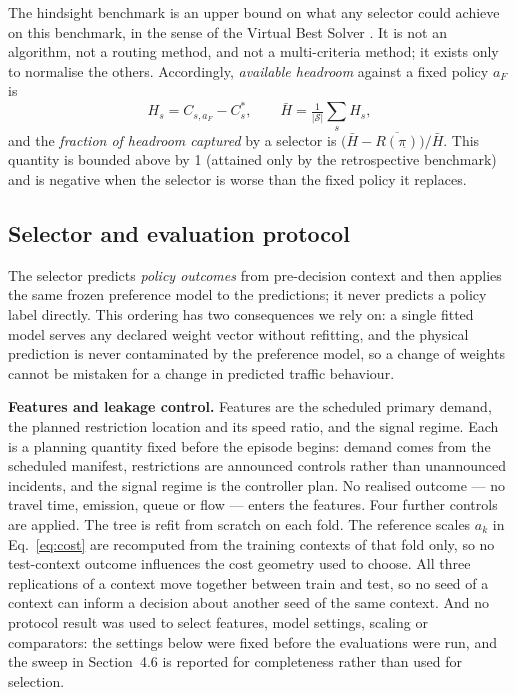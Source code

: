 \documentclass[10pt,a4paper]{article}
\begin{document}
The hindsight benchmark is an upper bound on what any selector could achieve on this benchmark, in the sense of the Virtual Best Solver \cite{bischl2016aslib}. It is not an algorithm, not a routing method, and not a multi-criteria method; it exists only to normalise the others. Accordingly, \emph{available headroom} against a fixed policy $a_F$ is
\begin{equation}
H_s=C_{s,a_F}-C^*_s ,\qquad \bar H=\tfrac1{|\mathcal S|}\textstyle\sum_s H_s ,
\label{eq:headroom}
\end{equation}
and the \emph{fraction of headroom captured} by a selector is $\big(\bar H-\overline{R(\pi_{\widehat{}})}\big)/\bar H$. This quantity is bounded above by 1 (attained only by the retrospective benchmark) and is negative when the selector is worse than the fixed policy it replaces.

\subsection{Selector and evaluation protocol}
The selector predicts \emph{policy outcomes} from pre-decision context and then applies the same frozen preference model to the predictions; it never predicts a policy label directly. This ordering has two consequences we rely on: a single fitted model serves any declared weight vector without refitting, and the physical prediction is never contaminated by the preference model, so a change of weights cannot be mistaken for a change in predicted traffic behaviour.

\textbf{Features and leakage control.} Features are the scheduled primary demand, the planned restriction location and its speed ratio, and the signal regime. Each is a planning quantity fixed before the episode begins: demand comes from the scheduled manifest, restrictions are announced controls rather than unannounced incidents, and the signal regime is the controller plan. No realised outcome --- no travel time, emission, queue or flow --- enters the features. Four further controls are applied. The tree is refit from scratch on each fold. The reference scales $a_k$ in Eq.~\eqref{eq:cost} are recomputed from the training contexts of that fold only, so no test-context outcome influences the cost geometry used to choose. All three replications of a context move together between train and test, so no seed of a context can inform a decision about another seed of the same context. And no protocol result was used to select features, model settings, scaling or comparators: the settings below were fixed before the evaluations were run, and the sweep in Section~4.6 is reported for completeness rather than used for selection.
\end{document}
